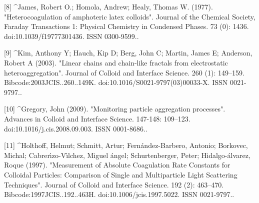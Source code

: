 [8]
^James, Robert O.; Homola, Andrew; Healy, Thomas W. (1977). "Heterocoagulation of amphoteric latex colloids". Journal of the Chemical Society, Faraday Transactions 1: Physical Chemistry in Condensed Phases. 73 (0): 1436. doi:10.1039/f19777301436. ISSN 0300-9599..

[9]
^Kim, Anthony Y; Hauch, Kip D; Berg, John C; Martin, James E; Anderson, Robert A (2003). "Linear chains and chain-like fractals from electrostatic heteroaggregation". Journal of Colloid and Interface Science. 260 (1): 149–159. Bibcode:2003JCIS..260..149K. doi:10.1016/S0021-9797(03)00033-X. ISSN 0021-9797..

[10]
^Gregory, John (2009). "Monitoring particle aggregation processes". Advances in Colloid and Interface Science. 147-148: 109–123. doi:10.1016/j.cis.2008.09.003. ISSN 0001-8686..

[11]
^Holthoff, Helmut; Schmitt, Artur; Fernández-Barbero, Antonio; Borkovec, Michal; Cabrerı́zo-Vı́lchez, Miguel ángel; Schurtenberger, Peter; Hidalgo-álvarez, Roque (1997). "Measurement of Absolute Coagulation Rate Constants for Colloidal Particles: Comparison of Single and Multiparticle Light Scattering Techniques". Journal of Colloid and Interface Science. 192 (2): 463–470. Bibcode:1997JCIS..192..463H. doi:10.1006/jcis.1997.5022. ISSN 0021-9797..